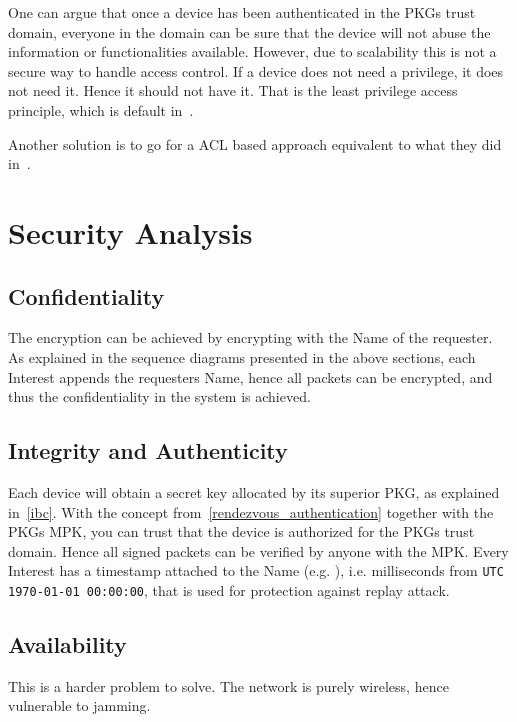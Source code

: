 One can argue that once a device has been authenticated in the \gls{PKG}s trust domain, everyone in the domain can be sure that the device will not abuse the information or functionalities available. 
However, due to scalability this is not a secure way to handle access control. 
If a device does not need a privilege, it does not need it.
Hence it should not have it. 
That is the least privilege access principle, which is default in~\cite{DBLP:conf/imis/GusmeroliPR12}.

Another solution is to go for a \gls{ACL} based approach equivalent to what they did in~\cite{DBLP:journals/network/ShangDMBZ14}.

\section{Security Analysis}

\todo{!!}

\subsection{Confidentiality}
The encryption can be achieved by encrypting with the Name of the requester.
As explained in the sequence diagrams presented in the above sections, each Interest appends the requesters Name, hence all packets can be encrypted, and thus the confidentiality in the system is achieved.

\subsection{Integrity and Authenticity}
Each device will obtain a secret key allocated by its superior \gls{PKG}, as explained in~\autoref{ibc}.
With the concept from~\autoref{rendezvous_authentication} together with the \gls{PKG}s \gls{MPK}, you can trust that the device is authorized for the \gls{PKG}s trust domain. Hence all signed packets can be verified by anyone with the \gls{MPK}.
Every Interest has a timestamp attached to the Name (e.g. ), i.e. milliseconds from \texttt{UTC 1970-01-01 00:00:00}, that is used for protection against replay attack. 

\subsection{Availability}
This is a harder problem to solve.
The network is purely wireless, hence vulnerable to jamming. 
